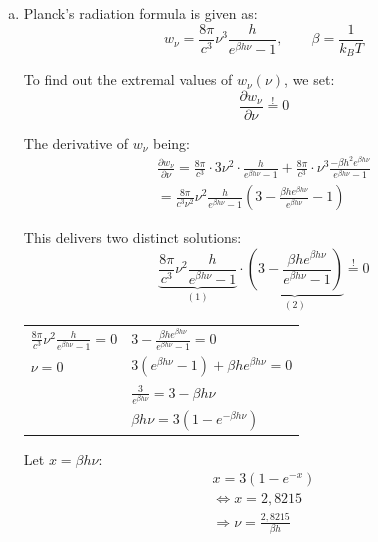 \documentclass[a4paper,german,12pt]{scrartcl}
\begin{document}
\begin{enumerate}[(a)]

\item
Planck's radiation formula is given as:
\begin{equation*}
w_\nu = \frac{8\pi}{c^3}\nu^3 \frac{h}{e^{\beta h\nu}-1}, \quad \quad \beta=\frac{1}{k_BT}
\end{equation*}

To find out the extremal values of $w_\nu(\nu)$, we set:
\begin{equation*}
\frac{\partial w_\nu}{\partial \nu}\overset{!}{=}0
\end{equation*}

The derivative of $w_\nu$ being:
\begin{align*}
\frac{\partial w_\nu}{\partial \nu}=\frac{8\pi}{c^3}\cdot 3\nu^2 \cdot \frac{h}{e^{\beta h\nu}-1}+\frac{8\pi}{c^3}\cdot\nu^3\frac{-\beta h^2 e^{\beta h \nu}}{e^{\beta h \nu}-1} \\
=\frac{8\pi}{c^3 \nu^2}\nu^2\frac{h}{e^{\beta h \nu} -1}\left(3-\frac{\beta h e^{\beta h \nu}}{e^{\beta h \nu}}-1\right)
\end{align*}

This delivers two distinct solutions:
\begin{equation*}
\underbrace{\frac{8\pi}{c^3}\nu^2\frac{h}{e^{\beta h \nu} -1}}_{(1)}\cdot \underbrace{\left(3-\frac{\beta h e^{\beta h \nu}}{e^{\beta h \nu}-1}\right)}_{(2)}\overset{!}{=}0
\end{equation*}

\begin{center}
\begin{tabular}{ll}
$\frac{8\pi}{c^3}\nu^2\frac{h}{e^{\beta h \nu} -1}=0$ & \quad \quad $3-\frac{\beta h e^{\beta h \nu}}{e^{\beta h \nu}-1}=0$\\
$\nu=0$  & \quad \quad $3\left(e^{\beta h \nu} -1\right)+\beta h e^{\beta h \nu}=0$\\
& \quad \quad $\frac{3}{e^{\beta h \nu}}=3-\beta h \nu$\\
& \quad \quad $\beta h \nu = 3\left(1-e^{-\beta h \nu}\right)$
\end{tabular}
\end{center}

Let $x=\beta h \nu$:
\begin{align*}
x=3\left(1-e^{-x}\right)\\
\Leftrightarrow x=2,8215\\
\Rightarrow \nu=\frac{2,8215}{\beta h}
\end{align*}


\end{enumerate}
\end{document}
